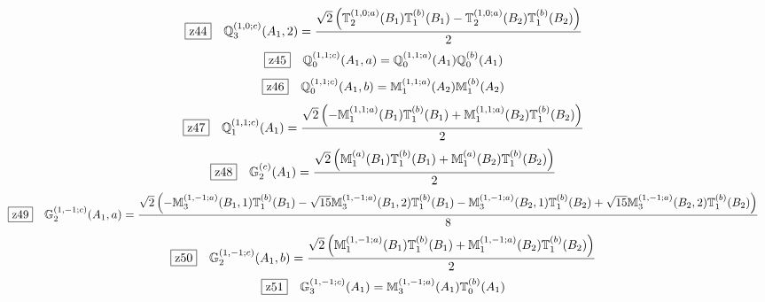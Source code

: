 \documentclass[fleqn,10pt,landscape]{jsarticle}
\begin{document}
\begin{dmath*}
\hspace*{3mm}\fbox{z44}\quad \mathbb{Q}_{3}^{(1,0;c)}(A_{1},2)=\frac{\sqrt{2} \left(\mathbb{T}_{2}^{(1,0;a)}(B_{1}) \mathbb{T}_{1}^{(b)}(B_{1}) - \mathbb{T}_{2}^{(1,0;a)}(B_{2}) \mathbb{T}_{1}^{(b)}(B_{2})\right)}{2}
\end{dmath*}
\begin{dmath*}
\hspace*{3mm}\fbox{z45}\quad \mathbb{Q}_{0}^{(1,1;c)}(A_{1},a)=\mathbb{Q}_{0}^{(1,1;a)}(A_{1}) \mathbb{Q}_{0}^{(b)}(A_{1})
\end{dmath*}
\begin{dmath*}
\hspace*{3mm}\fbox{z46}\quad \mathbb{Q}_{0}^{(1,1;c)}(A_{1},b)=\mathbb{M}_{1}^{(1,1;a)}(A_{2}) \mathbb{M}_{1}^{(b)}(A_{2})
\end{dmath*}
\begin{dmath*}
\hspace*{3mm}\fbox{z47}\quad \mathbb{Q}_{1}^{(1,1;c)}(A_{1})=\frac{\sqrt{2} \left(- \mathbb{M}_{1}^{(1,1;a)}(B_{1}) \mathbb{T}_{1}^{(b)}(B_{1}) + \mathbb{M}_{1}^{(1,1;a)}(B_{2}) \mathbb{T}_{1}^{(b)}(B_{2})\right)}{2}
\end{dmath*}
\begin{dmath*}
\hspace*{3mm}\fbox{z48}\quad \mathbb{G}_{2}^{(c)}(A_{1})=\frac{\sqrt{2} \left(\mathbb{M}_{1}^{(a)}(B_{1}) \mathbb{T}_{1}^{(b)}(B_{1}) + \mathbb{M}_{1}^{(a)}(B_{2}) \mathbb{T}_{1}^{(b)}(B_{2})\right)}{2}
\end{dmath*}
\begin{dmath*}
\hspace*{3mm}\fbox{z49}\quad \mathbb{G}_{2}^{(1,-1;c)}(A_{1},a)=\frac{\sqrt{2} \left(- \mathbb{M}_{3}^{(1,-1;a)}(B_{1},1) \mathbb{T}_{1}^{(b)}(B_{1}) - \sqrt{15} \mathbb{M}_{3}^{(1,-1;a)}(B_{1},2) \mathbb{T}_{1}^{(b)}(B_{1}) - \mathbb{M}_{3}^{(1,-1;a)}(B_{2},1) \mathbb{T}_{1}^{(b)}(B_{2}) + \sqrt{15} \mathbb{M}_{3}^{(1,-1;a)}(B_{2},2) \mathbb{T}_{1}^{(b)}(B_{2})\right)}{8}
\end{dmath*}
\begin{dmath*}
\hspace*{3mm}\fbox{z50}\quad \mathbb{G}_{2}^{(1,-1;c)}(A_{1},b)=\frac{\sqrt{2} \left(\mathbb{M}_{1}^{(1,-1;a)}(B_{1}) \mathbb{T}_{1}^{(b)}(B_{1}) + \mathbb{M}_{1}^{(1,-1;a)}(B_{2}) \mathbb{T}_{1}^{(b)}(B_{2})\right)}{2}
\end{dmath*}
\begin{dmath*}
\hspace*{3mm}\fbox{z51}\quad \mathbb{G}_{3}^{(1,-1;c)}(A_{1})=\mathbb{M}_{3}^{(1,-1;a)}(A_{1}) \mathbb{T}_{0}^{(b)}(A_{1})
\end{dmath*}
\end{document}
